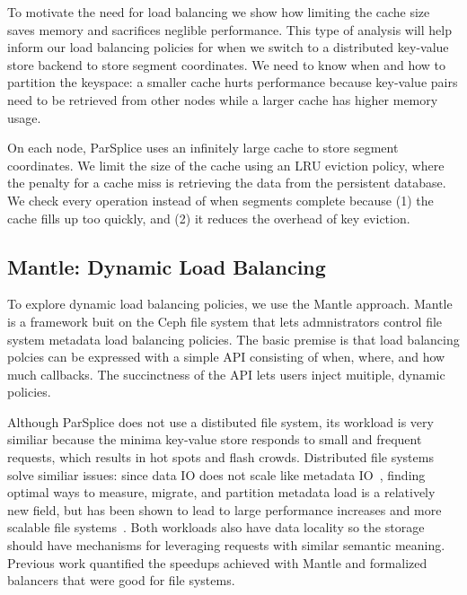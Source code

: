 To motivate the need for load balancing we show how limiting the cache size
saves memory and sacrifices neglible performance. This type of analysis will
help inform our load balancing policies for when we switch to a distributed
key-value store backend to store segment coordinates.  We need to know when and
how to partition the keyspace: a smaller cache hurts performance because
key-value pairs need to be retrieved from other nodes while a larger cache has
higher memory usage. 

On each node, ParSplice uses an infinitely large cache to store segment
coordinates. We limit the size of the cache using an LRU eviction policy, where
the penalty for a cache miss is retrieving the data from the persistent
database.  We check every operation instead of when segments complete because
(1) the cache fills up too quickly, and (2) it reduces the overhead of key
eviction.

\subsection{Mantle: Dynamic Load Balancing}
\label{sec:mantle-dynamic-load-balancing}
To explore dynamic load balancing policies, we use the Mantle approach.  Mantle
is a framework buit on the Ceph file system that lets admnistrators control
file system metadata load balancing policies. The basic premise is that load
balancing polcies can be expressed with a simple API consisting of when, where,
and how much callbacks. The succinctness of the API lets users inject
muitiple, dynamic policies.  

Although ParSplice does not use a distibuted file system, its workload is very
similiar because the minima key-value store responds to small and frequent
requests, which results in hot spots and flash crowds.  Distributed file
systems solve similiar issues: since data IO does not scale like metadata
IO~\cite{roselli:atec2000-FS-workloads}, finding optimal ways to measure,
migrate, and partition metadata load is a relatively new field, but has been
shown to lead to large performance increases and more scalable file
systems~\cite{zheng:pdsw2014-batchfs, grider:pdsw2015-marfs,
ren:sc2014-indexfs, patil:fast2011-giga+, brandt:msst2003-lh}.  Both workloads
also have data locality so the storage should have mechanisms for leveraging
requests with similar semantic meaning.  Previous work quantified the speedups
achieved with Mantle and formalized balancers that were good for file systems.


